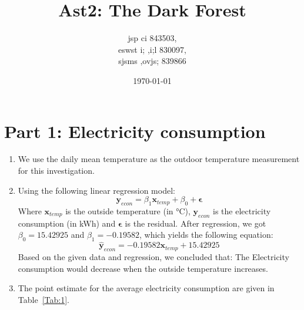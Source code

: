 \documentclass[12pt]{article}
\title{Ast2: The Dark Forest}
\author{jsp ci 843503,\\ 
	eswst i; ,i;l 830097,\\ 
sjsms ,ovjs; 839866}
\date{\today}
\begin{document}
	
\maketitle

\section{Part 1: Electricity consumption}

\begin{enumerate}
	\item We use the daily mean temperature as the outdoor temperature measurement for this investigation.
	\item Using the following linear regression model:
\[
\mathbf{y}_{econ} = \beta_1 \mathbf{x}_{temp} + \beta_0 + \mathbf{\epsilon}
\] 
Where $\mathbf{x}_{temp}$ is the outside temperature (in °C), $\mathbf{y}_{econ}$ is the electricity consumption (in kWh) and $\mathbf{\epsilon}$ is the residual. After regression, we got $\beta_0 = 15.42925$ and $\beta_1 = -0.19582$, which yields the following equation:
\[
\hat{\mathbf{y}}_{econ} = -0.19582 \mathbf{x}_{temp} + 15.42925
\] 
Based on the given data and regression, we concluded that: 
The Electricity consumption would decrease when the outside temperature increases.
\item The point estimate for the average electricity consumption are given in Table~\ref{Tab:1}.


\end{enumerate}
\end{document}
